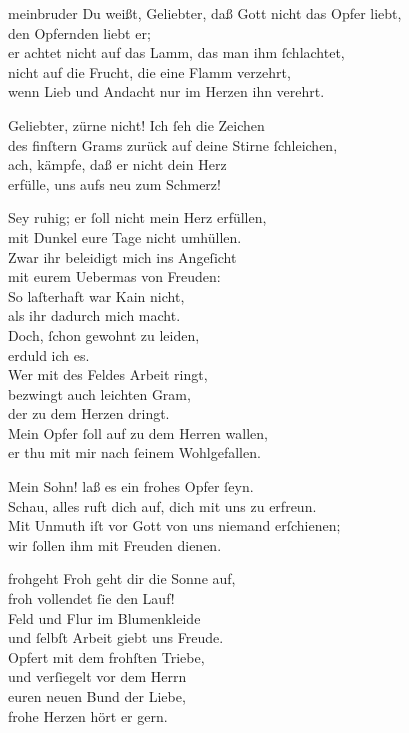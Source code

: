 \documentclass[tocstyle=ref-genre]{ees}
\begin{document}
{\begin{movement}{meinbruder}
  \voice[Abel]
  Du weißt, Geliebter, daß Gott nicht das Opfer liebt,\\
  den Opfernden liebt er;\\
  er achtet nicht auf das Lamm, das man ihm ſchlachtet,\\
  nicht auf die Frucht, die eine Flamm verzehrt,\\
  wenn Lieb und Andacht nur im Herzen ihn verehrt.

  \voice[Mehala]
  Geliebter, zürne nicht! Ich ſeh die Zeichen\\
  des finſtern Grams zurück auf deine Stirne ſchleichen,\\
  ach, kämpfe, daß er nicht dein Herz\\
  erfülle, uns aufs neu zum Schmerz!

  \voice[Kain]
  Sey ruhig; er ſoll nicht mein Herz erfüllen,\\
  mit Dunkel eure Tage nicht umhüllen.\\
  Zwar ihr beleidigt mich ins Angeſicht\\
  mit eurem Uebermas von Freuden:\\
  So laſterhaft war Kain nicht,\\
  als ihr dadurch mich macht.\\
  Doch, ſchon gewohnt zu leiden,\\
  erduld ich es.\\
  Wer mit des Feldes Arbeit ringt,\\
  bezwingt auch leichten Gram,\\
  der zu dem Herzen dringt.\\
  Mein Opfer ſoll auf zu dem Herren wallen,\\
  er thu mit mir nach ſeinem Wohlgefallen.

  \voice[Adam]
  Mein Sohn! laß es ein frohes Opfer ſeyn.\\
  Schau, alles ruft dich auf, dich mit uns zu erfreun.\\
  Mit Unmuth iſt vor Gott von uns niemand erſchienen;\\
  wir ſollen ihm mit Freuden dienen.
\end{movement}

\begin{movement}{frohgeht}
  \voice[Mehala]
  Froh geht dir die Sonne auf,\\
  froh vollendet ſie den Lauf!\\
  Feld und Flur im Blumenkleide\\
  und ſelbſt Arbeit giebt uns Freude.\\
  Opfert mit dem frohſten Triebe,\\
  und verſiegelt vor dem Herrn\\
  euren neuen Bund der Liebe,\\
  frohe Herzen hört er gern.
\end{movement}

}
\end{document}
